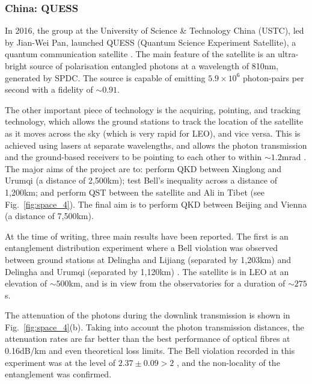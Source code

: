 %
%

\subsubsection{China: QUESS}

In 2016, the group at the University of Science \& Technology China (USTC), led by Jian-Wei Pan, launched QUESS (Quantum Science Experiment Satellite), a quantum communication satellite \cite{bib:gibney16, bib:xin11}. The main feature of the satellite is an ultra-bright source of polarisation entangled photons at a wavelength of 810nm, generated by SPDC. The source is capable of emitting $5.9 \times 10^6$ photon-pairs per second with a fidelity of $\sim 0.91$.

The other important piece of technology is the acquiring, pointing, and tracking technology, which allows the ground stations to track the location of the satellite as it moves across the sky (which is very rapid for LEO), and vice versa. This is achieved using lasers at separate wavelengths, and allows the photon transmission and the ground-based receivers to be pointing to each other to within $\sim 1.2$mrad \cite{bib:yin2017satellite}. The major aims of the project are to: perform QKD between Xinglong and Urumqi (a distance of 2,500km); test Bell's inequality across a distance of 1,200km; and perform QST between the satellite and Ali in Tibet (see Fig.~\ref{fig:space_4}). The final aim is to perform QKD between Beijing and Vienna (a distance of 7,500km). 

At the time of writing, three main results have been reported. The first is an entanglement distribution experiment where a Bell violation was observed between ground stations at Delingha and Lijiang (separated by 1,203km) and Delingha and Urumqi (separated by 1,120km) \cite{bib:yin2017satellite}. The satellite is in LEO at an elevation of $\sim 500$km, and is in view from the observatories for a duration of $\sim 275$s.

The attenuation of the photons during the downlink transmission is shown in Fig.~\ref{fig:space_4}(b). Taking into account the photon transmission distances, the attenuation rates are far better than the best performance of optical fibres at 0.16dB/km \cite{bib:yin2013lower} and even theoretical loss limits. The Bell violation recorded in this experiment was at the level of $2.37\pm 0.09>2$ , and the non-locality of the entanglement was confirmed.

